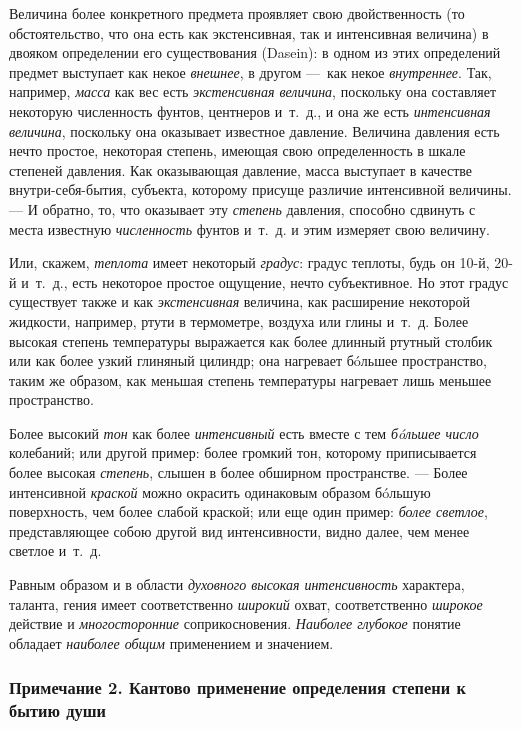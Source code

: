 Величина более конкретного предмета проявляет свою двойственность (то
обстоятельство, что она есть как экстенсивная, так и интенсивная величина)
в двояком определении его существования (Dasein): в одном из этих
определений предмет выступает как некое {\em внешнее},
в другом —~как некое {\em внутреннее}. Так, например,
{\em масса} как вес есть
{\em экстенсивная величина}, поскольку она составляет
некоторую численность фунтов, центнеров и~т.~д., и она же есть
{\em интенсивная величина}, поскольку она оказывает
известное давление. Величина давления есть нечто простое, некоторая
степень, имеющая свою определенность в шкале степеней давления. Как
оказывающая давление, масса выступает в качестве внутри-себя-бытия,
субъекта, которому присуще различие интенсивной величины. — И обратно, то,
что оказывает эту {\em степень} давления, способно
сдвинуть с места известную {\em численность} фунтов
и~т.~д. и этим измеряет свою величину.

Или, скажем, {\em теплота} имеет некоторый
{\em градус}: градус теплоты, будь он 10-й, 20-й
и~т.~д., есть некоторое простое ощущение, нечто субъективное. Но этот
градус существует также и как {\em экстенсивная}
величина, как расширение некоторой жидкости, например, ртути в термометре,
воздуха или глины и~т.~д. Более высокая степень температуры выражается как
более длинный ртутный столбик или как более узкий глиняный цилиндр; она
нагревает бóльшее пространство, таким же образом, как меньшая степень
температуры нагревает лишь меньшее пространство.

Более высокий {\em тон} как более
{\em интенсивный} есть вместе с тем
{\em бóльшее число} колебаний; или другой пример: более
громкий тон, которому приписывается более высокая
{\em степень}, слышен в более обширном пространстве. —
Более интенсивной {\em краской} можно окрасить
одинаковым образом бóльшую поверхность, чем более слабой краской; или еще
один пример: {\em более светлое}, представляющее собою
другой вид интенсивности, видно далее, чем менее светлое и~т.~д.

Равным образом и в области {\em духовного высокая
интенсивность} характера, таланта, гения имеет соответственно
{\em широкий} охват, соответственно
{\em широкое} действие и
{\em многосторонние} соприкосновения.
{\em Наиболее глубокое} понятие обладает
{\em наиболее общим} применением и значением.


\subsubsection[Примечание 2. Кантово применение определения степени к бытию души]
{Примечание 2. Кантово применение определения степени к бытию души}

